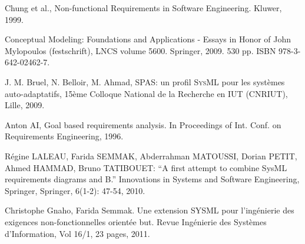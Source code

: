 \documentclass[10pt, conference, compsocconf]{IEEEtran}
\def\sysml{\textsc{SysML}}
\begin{document}
\begin{thebibliography}{1}
Chung et al., Non-functional Requirements in Software Engineering. Kluwer, 1999.

Conceptual Modeling: Foundations and Applications - Essays in Honor of John Mylopoulos (festschrift), LNCS volume 5600. Springer, 2009.  530 pp. ISBN 978-3-642-02462-7.

J. M. Bruel, N. Belloir, M. Ahmad, SPAS: un profil \sysml{} pour les syst\`emes auto-adaptatifs, 15\`eme Colloque National de la Recherche en IUT (CNRIUT), Lille, 2009.

 Anton AI, Goal based requirements analysis. In Proceedings of Int. Conf. on Requirements Engineering, 1996.

 R\'egine LALEAU, Farida SEMMAK, Abderrahman MATOUSSI, Dorian PETIT, Ahmed HAMMAD, Bruno TATIBOUET: ``A first attempt to combine SysML requirements diagrams and B.'' Innovations in Systems and Software Engineering, Springer, Springer, 6(1-2): 47-54, 2010.

 Christophe Gnaho, Farida Semmak. Une extension SYSML pour l'ing\'enierie des exigences non-fonctionnelles orient\'ee but. Revue Ing\'enierie des Syst\`emes d'Information, Vol 16/1, 23 pages, 2011.


\end{thebibliography}




\end{document}
